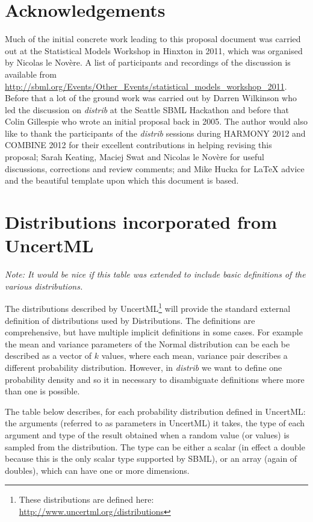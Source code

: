 \documentclass[draftspec]{sbmlpkgspec}
\newcommand{\distribshort}{\emph{distrib}\xspace}
\newcommand{\distrib}{Distributions\xspace}
\newcommand{\uncertml}{UncertML\xspace}
\begin{document}
\section{Acknowledgements}
\label{sec:acknowledgements}

Much of the initial concrete work leading to this proposal document
was carried out at the Statistical Models Workshop in Hinxton in 2011,
which was organised by Nicolas le Nov\`{e}re. A list of participants
and recordings of the discussion is available from
\url{http://sbml.org/Events/Other_Events/statistical_models_workshop_2011}.
Before that a lot of the ground work was carried out by Darren
Wilkinson who led the discussion on \distribshort at the Seattle SBML
Hackathon and before that Colin Gillespie who wrote an initial
proposal back in 2005. The author would also like to thank the
participants of the \distribshort sessions during HARMONY 2012 and
COMBINE 2012 for their excellent contributions in helping revising
this proposal; Sarah Keating, Maciej Swat and Nicolas le Nov\`{e}re
for useful discussions, corrections and review comments; and Mike
Hucka for \LaTeX{} advice and the beautiful template upon which this
document is based.

\appendix
\section{Distributions incorporated from \uncertml}
\label{sec:uncertmlusage}

\emph{Note: It would be nice if this table was extended to include basic definitions of the various distributions.}

The distributions described by \uncertml \footnote{These
  distributions are defined here:
  \url{http://www.uncertml.org/distributions}} will provide the
standard external definition of distributions used by \distrib. The
definitions are comprehensive, but have multiple implicit definitions
in some cases. For example the mean and variance parameters of the
Normal distribution can be each be described as a vector of $k$
values, where each mean, variance pair describes a different
probability distribution. However, in \distribshort we want to define
one probability density and so it in necessary to disambiguate
definitions where more than one is possible.

The table below describes, for each probability distribution defined in
\uncertml: the arguments (referred to as parameters in \uncertml) it
takes, the type of each argument and type of the result obtained when
a random value (or values) is sampled from the distribution. The type
can be either a scalar (in effect a double because this is the only
scalar type supported by SBML), or an array (again of doubles), which
can have one or more dimensions.
\end{document}
